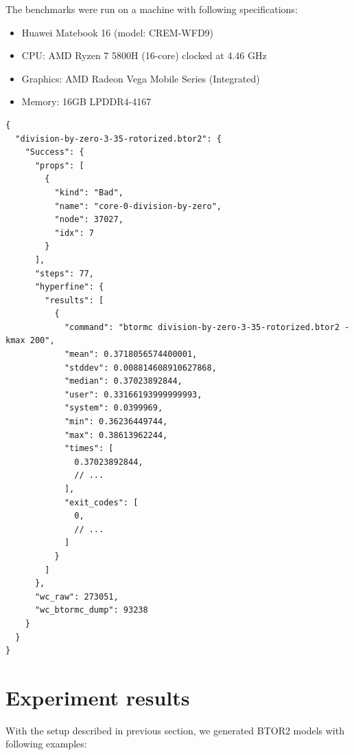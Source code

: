 \documentclass[12pt]{article}
\begin{document}
The benchmarks were run on a machine with following specifications: 
\begin{itemize}
    \item Huawei Matebook 16 (model: CREM-WFD9)
    \item CPU: AMD Ryzen 7 5800H (16-core) clocked at 4.46 GHz
    \item Graphics: AMD Radeon Vega Mobile Series (Integrated)
    \item Memory: 16GB LPDDR4-4167
\end{itemize}

\begin{lstlisting}[label=lst:results_file, caption={Example of \texttt{peRISCope} results file}, captionpos=b]
{
  "division-by-zero-3-35-rotorized.btor2": {
    "Success": {
      "props": [
        {
          "kind": "Bad",
          "name": "core-0-division-by-zero",
          "node": 37027,
          "idx": 7
        }
      ],
      "steps": 77,
      "hyperfine": {
        "results": [
          {
            "command": "btormc division-by-zero-3-35-rotorized.btor2 -kmax 200",
            "mean": 0.3718056574400001,
            "stddev": 0.008814608910627868,
            "median": 0.37023892844,
            "user": 0.33166193999999993,
            "system": 0.0399969,
            "min": 0.36236449744,
            "max": 0.38613962244,
            "times": [
              0.37023892844,
              // ...
            ],
            "exit_codes": [
              0,
              // ...
            ]
          }
        ]
      },
      "wc_raw": 273051,
      "wc_btormc_dump": 93238
    }
  }
}
\end{lstlisting}

\section{Experiment results}

With the setup described in previous section, we generated BTOR2 models with 
following examples: 
\end{document}
